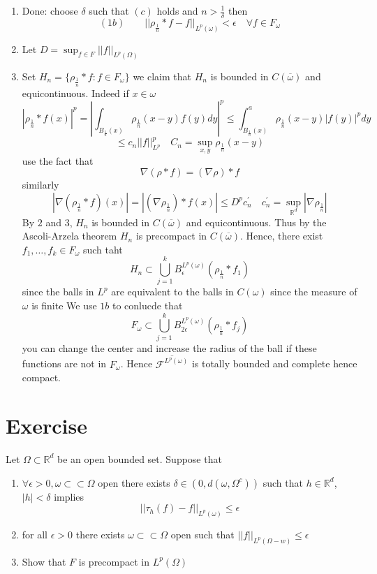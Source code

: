 \documentclass[11pt]{article}
\begin{document}
\begin{enumerate}
    \item Done: choose $\delta$ such that $(c)$ holds and  $n > \frac{1}{\delta}$ then
        \[
            (1b) \qquad ||\rho_{\frac{1}{n}} * f - f||_{L^{p}(\omega)} < \epsilon \quad \forall f \in F_\omega
        \] 
    \item Let $D = \sup_{f \in F} ||f||_{L^{p}(\Omega)}$
    \item Set $H_n = \{\rho_{\frac{1}{n}} * f : f \in F_\omega\}$ we claim that $H_n$ is bounded in  $C(\overline{\omega})$ and equicontinuous.
        Indeed if $x \in \omega$
         \[
             |\rho_{\frac{1}{n}} * f(x)|^{p} =\left| \int_{ B_{\frac{1}{n}}(x)}^{}\rho_{\frac{1}{n}}(x-y)f(y)dy\right|^{p} \le \int_{B_{\frac{1}{n}}(x)}^{a} \rho_{\frac{1}{n}}(x-y)|f(y)|^{p}dy
        \] 
        \[
            \le c_n ||f||_{L^{p}}^{p} \quad C_n = \sup_{x,y} \rho_{\frac{1}{n}}(x-y)
        \] 
        use the fact that
        \[
        \nabla( \rho * f) = (\nabla \rho) * f
        \] 
        similarly
        \[
            |\nabla (\rho_{\frac{1}{n}} * f)(x)| = |(\nabla \rho_{\frac{1}{n}}) * f(x)| \le D^{p} c_n^{'} \quad c_n^{'} = \sup_{ \mathbb{R}^{d}} | \nabla \rho_{\frac{1}{n}}|
        \] 
        By $2$ and $3$,  $H_n$ is bounded in   $C(\overline{\omega}) $ and equicontinuous.
        Thus by the Ascoli-Arzela theorem $H_n$ is precompact in  $ C(\overline{\omega})$. Hence, there exist $f_1,\dots,f_k \in F_\omega$ such taht
        \[
        H_n \subset \bigcup_{j=1}^{k}B^{L^{p}(\omega)}_\epsilon( \rho_{\frac{1}{n}} * f_1)
        \] 
        since the balls in $L^{p}$ are equivalent to the balls in $C(\omega)$ since the measure of  $\omega$ is finite
        We use $1b$ to conlucde that
         \[
             F_\omega \subset \bigcup_{j=1}^{k}B_{2\epsilon}^{L^{p}(\omega)}(\rho_{\frac{1}{n}} * f_j)
        \] 
        you can change the center and increase the radius of the ball if these functions are not in $F_\omega$.
        Hence $\overline{ \mathcal{F}^{L^{p}(\omega)}}$ is totally bounded and complete hence compact.

\end{enumerate}

\section{Exercise}
Let $\Omega \subset \mathbb{R}^{d}$ be an open bounded set. Suppose that
\begin{enumerate}
    \item $\forall \epsilon > 0, \omega \subset \subset \Omega$ open there exists $\delta \in (0, d(\omega, \Omega^{c}))$ such that $h \in \mathbb{R}^{d}$, $|h| < \delta$
        implies
        \[
            ||\tau_h(f) - f||_{L^{p}(\omega)} \le \epsilon
        \] 
    \item for all $\epsilon > 0$ there exists $\omega \subset \subset \Omega$ open such that $||f||_{L^{p}(\Omega-w)} \le \epsilon$
    \item Show that $F$ is precompact in $L^{p}(\Omega)$
\end{enumerate}
\end{document}
